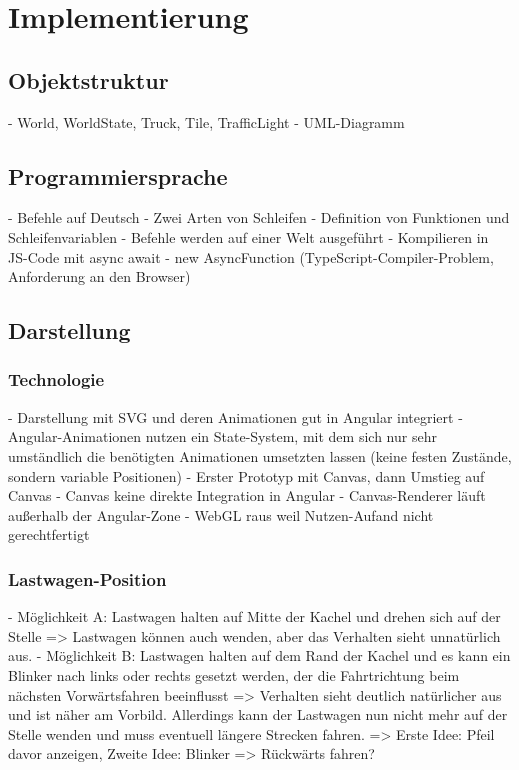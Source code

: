 \chapter{Implementierung}
\label{sec:implementation}

\section{Objektstruktur}

- World, WorldState, Truck, Tile, TrafficLight
- UML-Diagramm

\section{Programmiersprache}

- Befehle auf Deutsch
- Zwei Arten von Schleifen
- Definition von Funktionen und Schleifenvariablen
- Befehle werden auf einer Welt ausgeführt
- Kompilieren in JS-Code mit async await
- new AsyncFunction (TypeScript-Compiler-Problem, Anforderung an den Browser)

\section{Darstellung}

\subsection{Technologie}

- Darstellung mit SVG und deren Animationen gut in Angular integriert
- Angular-Animationen nutzen ein State-System, mit dem sich nur sehr umständlich
  die benötigten Animationen umsetzten lassen (keine festen Zustände, sondern
  variable Positionen)
- Erster Prototyp mit Canvas, dann Umstieg auf Canvas
- Canvas keine direkte Integration in Angular
- Canvas-Renderer läuft außerhalb der Angular-Zone
- WebGL raus weil Nutzen-Aufand nicht gerechtfertigt

\subsection{Lastwagen-Position}

- Möglichkeit A: Lastwagen halten auf Mitte der Kachel und drehen sich auf der
                 Stelle => Lastwagen können auch wenden, aber das Verhalten
                 sieht unnatürlich aus.
- Möglichkeit B: Lastwagen halten auf dem Rand der Kachel und es kann ein
                 Blinker nach links oder rechts gesetzt werden, der die
                 Fahrtrichtung beim nächsten Vorwärtsfahren beeinflusst
                 => Verhalten sieht deutlich natürlicher aus und ist näher am
                 Vorbild. Allerdings kann der Lastwagen nun nicht mehr auf der
                 Stelle wenden und muss eventuell längere Strecken fahren.
                 => Erste Idee: Pfeil davor anzeigen, Zweite Idee: Blinker
                 => Rückwärts fahren?

